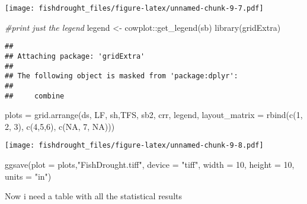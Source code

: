 \documentclass[
]{article}
\newenvironment{Shaded}{\begin{snugshade}}{\end{snugshade}}
\newcommand{\AttributeTok}[1]{\textcolor[rgb]{0.77,0.63,0.00}{#1}}
\newcommand{\CommentTok}[1]{\textcolor[rgb]{0.56,0.35,0.01}{\textit{#1}}}
\newcommand{\ConstantTok}[1]{\textcolor[rgb]{0.00,0.00,0.00}{#1}}
\newcommand{\DecValTok}[1]{\textcolor[rgb]{0.00,0.00,0.81}{#1}}
\newcommand{\FunctionTok}[1]{\textcolor[rgb]{0.00,0.00,0.00}{#1}}
\newcommand{\NormalTok}[1]{#1}
\newcommand{\OtherTok}[1]{\textcolor[rgb]{0.56,0.35,0.01}{#1}}
\newcommand{\SpecialCharTok}[1]{\textcolor[rgb]{0.00,0.00,0.00}{#1}}
\newcommand{\StringTok}[1]{\textcolor[rgb]{0.31,0.60,0.02}{#1}}
\begin{document}
\texttt{[image: fishdrought\_files/figure-latex/unnamed-chunk-9-7.pdf]}

\begin{Shaded}
\begin{Highlighting}[]
\CommentTok{\#print just the legend}
\NormalTok{legend }\OtherTok{\textless{}{-}}\NormalTok{ cowplot}\SpecialCharTok{::}\FunctionTok{get\_legend}\NormalTok{(sb)}
 \FunctionTok{library}\NormalTok{(gridExtra)}
\end{Highlighting}
\end{Shaded}

\begin{verbatim}
## 
## Attaching package: 'gridExtra'
## 
## The following object is masked from 'package:dplyr':
## 
##     combine
\end{verbatim}

\begin{Shaded}
\begin{Highlighting}[]
\NormalTok{plots }\OtherTok{=} \FunctionTok{grid.arrange}\NormalTok{(ds, LF, sh,TFS, sb2, crr, legend,  }\AttributeTok{layout\_matrix =} \FunctionTok{rbind}\NormalTok{(}\FunctionTok{c}\NormalTok{(}\DecValTok{1}\NormalTok{, }\DecValTok{2}\NormalTok{, }\DecValTok{3}\NormalTok{),}
                        \FunctionTok{c}\NormalTok{(}\DecValTok{4}\NormalTok{,}\DecValTok{5}\NormalTok{,}\DecValTok{6}\NormalTok{), }\FunctionTok{c}\NormalTok{(}\ConstantTok{NA}\NormalTok{, }\DecValTok{7}\NormalTok{, }\ConstantTok{NA}\NormalTok{)))}
\end{Highlighting}
\end{Shaded}

\texttt{[image: fishdrought\_files/figure-latex/unnamed-chunk-9-8.pdf]}

\begin{Shaded}
\begin{Highlighting}[]
\FunctionTok{ggsave}\NormalTok{(}\AttributeTok{plot =}\NormalTok{ plots,}\StringTok{"FishDrought.tiff"}\NormalTok{, }\AttributeTok{device =} \StringTok{"tiff"}\NormalTok{, }\AttributeTok{width =} \DecValTok{10}\NormalTok{, }\AttributeTok{height =} \DecValTok{10}\NormalTok{, }\AttributeTok{units =} \StringTok{"in"}\NormalTok{)}
\end{Highlighting}
\end{Shaded}

Now i need a table with all the statistical results
\end{document}
